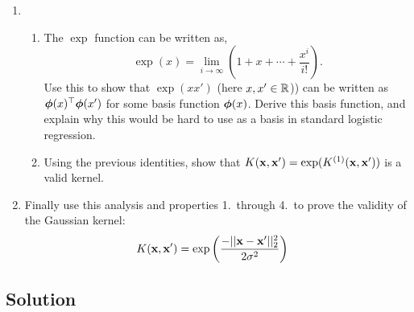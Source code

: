 \documentclass[submit]{harvardml}
\begin{document}
\begin{problem}
\begin{enumerate}
  [Hint: Use the property that for any
  $\bphi(\boldx)$,
  $K(\boldx, \boldx') = \bphi(\boldx)^\top\bphi(\boldx')$ forms a
  positive semi-definite kernel matrix. ]
  \item 
  \begin{enumerate}
  	\item The $\exp$ function can be written as,
  	$$\exp(x) = \lim_{i\rightarrow \infty} \left(1 + x + \cdots + \frac{x^i}{i!}\right).$$
  	  Use this to show that $\exp(xx')$ (here
          $x, x'\in \mathbb{R}$)) can be written as $\boldsymbol{\phi}(x)^\top \boldsymbol{\phi}(x')$ for some basis function $\boldsymbol{\phi}(x)$. Derive this basis function,
          and explain why this  would be hard to use as a basis in standard logistic regression.
  	\item Using the previous identities, show that $K(\mathbf{x}, \mathbf{x}') = \exp( K^{(1)}(\mathbf{x}, \mathbf{x}'))$ is a valid kernel.
  	

  \end{enumerate}
  \item  Finally use this analysis and properties 1.~through 4.~to prove the validity of the Gaussian kernel:
  \begin{align*}
	K(\mathbf{x}, \mathbf{x}') &= \exp \left( \frac{-||\mathbf{x} - \mathbf{x}'||^2_2}{2\sigma^2} \right) 
  \end{align*}
  \end{enumerate}



 \end{problem}
\subsection*{Solution}
\end{document}
